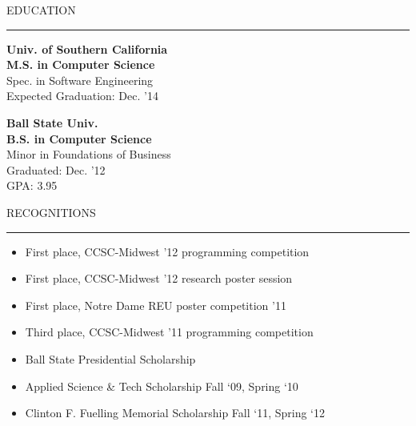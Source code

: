 \documentclass[a4paper,10pt]{article}
\newcommand{\header}[1]
{
{\Large{\uppercase{#1}}}
\vspace{0.05in}
\hrule
\vspace{0.15in}
}
\newenvironment{details}
{\begin{itemize}[label=\ding{212},leftmargin=0.2in]}
{\end{itemize}}
\begin{document}
\begin{minipage}[t]{0.35\textwidth}
\header{EDUCATION}

\textbf{Univ. of Southern California\\
M.S. in Computer Science\\}
Spec. in Software Engineering\\
Expected Graduation: Dec. '14
\vspace*{1\baselineskip}

\textbf{Ball State Univ.\\
B.S. in Computer Science\\}
Minor in Foundations of Business\\
Graduated: Dec. '12\\
GPA: 3.95


\header{RECOGNITIONS}

\begin{details}
  \item First place, CCSC-Midwest '12 programming competition
  \item First place, CCSC-Midwest '12 research poster session
  \item First place, Notre Dame REU poster competition '11
  \item Third place, CCSC-Midwest '11 programming competition
  \item Ball State Presidential Scholarship
  \item Applied Science \& Tech Scholarship Fall ‘09, Spring ‘10
  \item Clinton F. Fuelling Memorial Scholarship Fall ‘11, Spring ‘12
\end{details}

\end{minipage}
\end{document}
